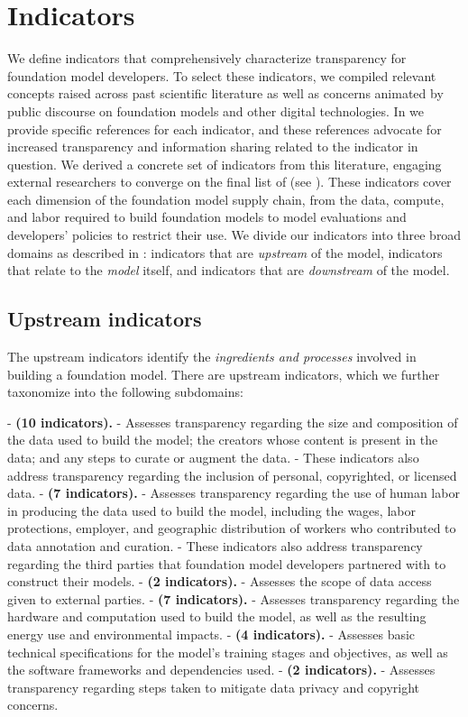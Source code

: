 \hypertarget{indicators}{\section{Indicators}}
\label{sec:indicators}
We define \numindicators indicators that comprehensively characterize transparency for foundation model developers.
To select these indicators, we compiled relevant concepts raised across past scientific literature as well as concerns animated by public discourse on foundation models and other digital technologies. In  we provide specific references for each indicator, and these references advocate for increased transparency and information sharing related to the indicator in question.
We derived a concrete set of indicators from this literature, engaging external researchers to converge on the final list of \numindicators (see ).
These indicators cover each dimension of the foundation model supply chain, from the data, compute, and labor required to build foundation models to model evaluations and developers' policies to restrict their use. 
We divide our indicators into three broad domains as described in : indicators that are \textit{upstream} of the model, indicators that relate to the \textit{model} itself, and indicators that are \textit{downstream} of the model.

\hypertarget{upstream-indicators}{\subsection{Upstream indicators}}
\label{sec:upstream-indicators}
The upstream indicators identify the \emph{ingredients and processes} involved in building a foundation model. 
There are \numupstreamindicators upstream indicators, which we further taxonomize into the following \numupstreamsubdomains subdomains:

-  \textbf{\data (10 indicators).}
- Assesses transparency regarding the size and composition of the data used to build the model; the creators whose content is present in the data; and any steps to curate or augment the data.
- These indicators also address transparency regarding the inclusion of personal, copyrighted, or licensed data.
-  \textbf{\labor (7 indicators).}
- Assesses transparency regarding the use of human labor in producing the data used to build the model, including the wages, labor protections, employer, and geographic distribution of workers who contributed to data annotation and curation.
- These indicators also address transparency regarding the third parties that foundation model developers partnered with to construct their models.
-  \textbf{\dataaccess (2 indicators).}
- Assesses the scope of data access given to external parties.
-  \textbf{\compute (7 indicators).}
- Assesses transparency regarding the hardware and computation used to build the model, as well as the resulting energy use and environmental impacts.
-  \textbf{\methods (4 indicators).}
- Assesses basic technical specifications for the model's training stages and objectives, as well as the software frameworks and dependencies used.
-  \textbf{\datamitigations (2 indicators).}
- Assesses transparency regarding steps taken to mitigate data privacy and copyright concerns.

